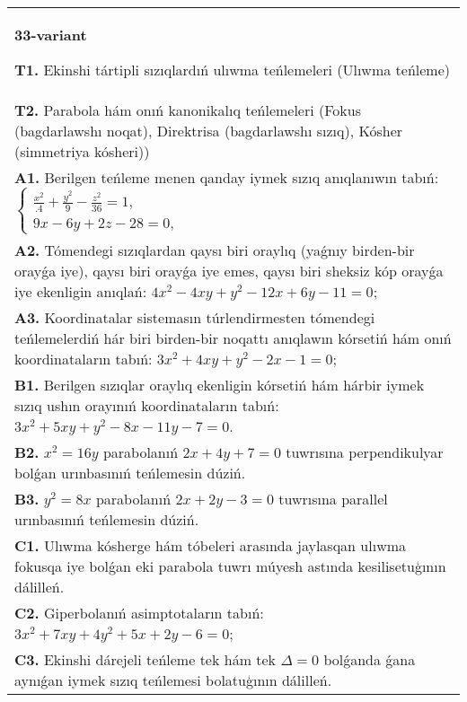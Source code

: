 \documentclass{article}
\begin{document}
\begin{tabular}{m{17cm}}
\textbf{33-variant}
\newline

\textbf{T1.} Ekinshi tártipli sızıqlardıń ulıwma teńlemeleri (Ulıwma teńleme) \\
\textbf{T2.} Parabola hám onıń kanonikalıq teńlemeleri (Fokus (bagdarlawshı noqat), Direktrisa (bagdarlawshı sızıq), Kósher (simmetriya kósheri)) \\
\textbf{A1.} Berilgen teńleme menen qanday iymek sızıq anıqlanıwın tabıń: $\left\{\begin{array}{l}\frac{x^2}{.4}+\frac{y^2}{9}-\frac{z^2}{36}=1, \\ 9 x-6 y+2 z-28=0,\end{array}\right.$ \\
\textbf{A2.} Tómendegi sızıqlardan qaysı biri oraylıq (yaǵnıy birden-bir orayǵa iye), qaysı biri orayǵa iye emes, qaysı biri sheksiz kóp orayǵa iye ekenligin anıqlań: $4 x^2-4 x y+y^2-12 x+6 y-11=0$; \\
\textbf{A3.} Koordinatalar sistemasın túrlendirmesten tómendegi teńlemelerdiń hár biri birden-bir noqattı anıqlawın kórsetiń hám onıń koordinataların tabıń: $3 x^2+4 x y+y^2-2 x-1=0$; \\
\textbf{B1.} Berilgen sızıqlar oraylıq ekenligin kórsetiń hám hárbir iymek sızıq ushın orayınıń koordinataların tabıń: $3x^2+5xy+y^2-8x-11y-7=0$. \\
\textbf{B2.} $x^2=16y$ parabolanıń $2x+4y+7=0$ tuwrısına perpendikulyar bolǵan urınbasınıń teńlemesin dúziń. \\
\textbf{B3.} $y^2=8x$ parabolanıń $2x+2y-3=0$ tuwrısına parallel urınbasınıń teńlemesin dúziń. \\
\textbf{C1.} Ulıwma kósherge hám tóbeleri arasında jaylasqan ulıwma fokusqa iye bolǵan eki parabola tuwrı múyesh astında kesilisetuģının dálilleń. \\
\textbf{C2.} Giperbolanıń asimptotaların tabıń: $3 x^2+7 x y+4 y^2+5 x+2 y-6=0$; \\
\textbf{C3.} Ekinshi dárejeli teńleme tek hám tek $\Delta=0$ bolǵanda ǵana aynıǵan iymek sızıq teńlemesi bolatuģının dálilleń. \\

\end{tabular}
\vspace{1cm}
\end{document}
